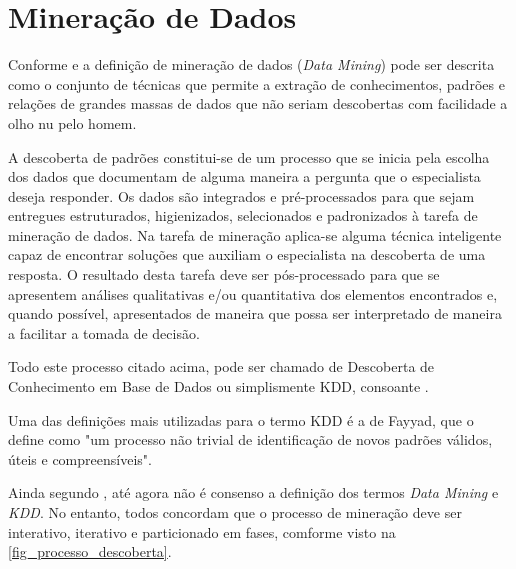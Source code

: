 \documentclass[
	12pt,				%
	openright,			%
	twoside,			%
	a4paper,			%
	english,			%
	french,				%
	spanish,			%
	brazil				%
	]{abntex2}
\begin{document}
\section{Mineração de Dados}
Conforme  e   a definição de mineração de dados (\emph{Data Mining}) pode ser descrita como o conjunto de técnicas que permite a extração de conhecimentos, padrões e relações de grandes massas de dados que não seriam descobertas com facilidade a olho nu pelo homem.

A descoberta de padrões constitui-se de um processo que se inicia pela escolha dos dados que documentam de alguma maneira a pergunta que o especialista deseja responder. Os dados são integrados e pré-processados para que sejam entregues estruturados, higienizados, selecionados e padronizados à tarefa de mineração de dados. Na tarefa de mineração aplica-se alguma técnica inteligente capaz de encontrar soluções que auxiliam o especialista na descoberta de uma resposta. O resultado desta tarefa deve ser pós-processado para que se apresentem análises qualitativas e/ou quantitativa dos elementos encontrados e, quando possível, apresentados de maneira que possa ser interpretado de maneira a facilitar a tomada de decisão. \cite[p.569 - p.570]{inproceedings}

Todo este processo citado acima, pode ser chamado de Descoberta de Conhecimento em Base de Dados ou simplismente KDD, consoante .

Uma das definições mais utilizadas para o termo KDD é a de Fayyad, que o define como "um processo não trivial de identificação de novos padrões válidos, úteis e compreensíveis".\cite[p.3]{camilo2009mineraccao}

Ainda segundo , até agora não é consenso a definição dos termos \emph{Data Mining} e \emph{KDD}. No entanto, todos concordam que o processo de mineração deve ser interativo, iterativo e particionado em fases, comforme visto na \autoref{fig_processo_descoberta}. 
\end{document}
